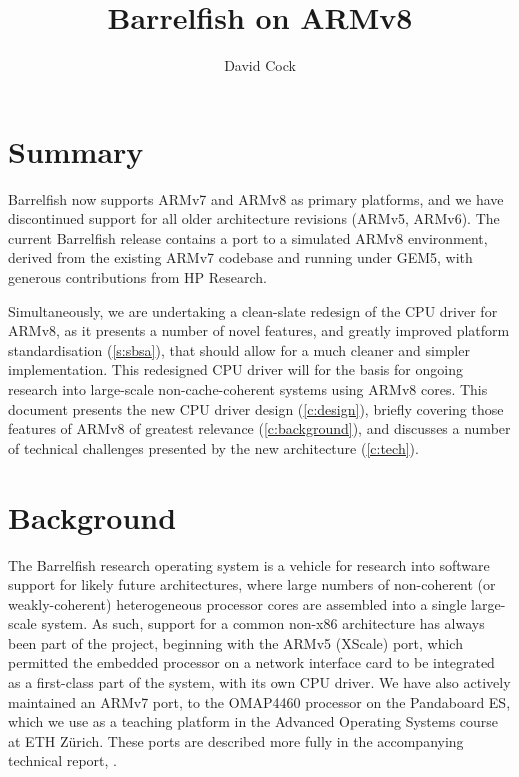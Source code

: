 \documentclass[a4paper,twoside]{report}
\title{Barrelfish on ARMv8}
\author{David Cock}
\begin{document}
\maketitle

\chapter{Summary}

Barrelfish now supports ARMv7 and ARMv8 as primary platforms, and we have
discontinued support for all older architecture revisions (ARMv5, ARMv6). The
current Barrelfish release contains a port to a simulated ARMv8 environment,
derived from the existing ARMv7 codebase and running under GEM5, with generous
contributions from HP Research.

Simultaneously, we are undertaking a clean-slate redesign of the CPU driver
for ARMv8, as it presents a number of novel features, and greatly improved
platform standardisation (\autoref{s:sbsa}), that should allow for a much
cleaner and simpler implementation. This redesigned CPU driver will for the
basis for ongoing research into large-scale non-cache-coherent systems using
ARMv8 cores. This document presents the new CPU driver design
(\autoref{c:design}), briefly covering those features of ARMv8 of greatest
relevance (\autoref{c:background}), and discusses a number of technical
challenges presented by the new architecture (\autoref{c:tech}).

\chapter{Background}\label{c:background}

The Barrelfish research operating system is a vehicle for research into
software support for likely future architectures, where large numbers of
non-coherent (or weakly-coherent) heterogeneous processor cores are assembled
into a single large-scale system. As such, support for a common non-x86
architecture has always been part of the project, beginning with the ARMv5
(XScale) port, which permitted the embedded processor on a network interface
card to be integrated as a first-class part of the system, with its own CPU
driver. We have also actively maintained an ARMv7 port, to the OMAP4460
processor on the Pandaboard ES, which we use as a teaching platform in the
Advanced Operating Systems course at ETH Z\"urich. These ports are described
more fully in the accompanying technical report, \citet{btn017-arm}.
\end{document}
